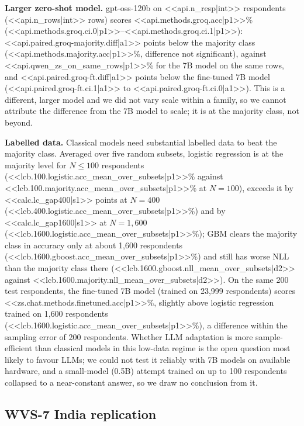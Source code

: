 \documentclass[conference]{IEEEtran}
\begin{document}
\textbf{Larger zero-shot model.} gpt-oss-120b on <<api.n_resp|int>> respondents (<<api.n_rows|int>> rows) scores <<api.methods.groq.acc|p1>>\% (<<api.methods.groq.ci.0|p1>>--<<api.methods.groq.ci.1|p1>>): <<api.paired.groq-majority.diff|a1>> points below the majority class (<<api.methods.majority.acc|p1>>\%, difference not significant), against <<api.qwen_zs_on_same_rows|p1>>\% for the 7B model on the same rows, and <<api.paired.groq-ft.diff|a1>> points below the fine-tuned 7B model (<<api.paired.groq-ft.ci.1|a1>> to <<api.paired.groq-ft.ci.0|a1>>). This is a different, larger model and we did not vary scale within a family, so we cannot attribute the difference from the 7B model to scale; it is at the majority class, not beyond.

\textbf{Labelled data.} Classical models need substantial labelled data to beat the majority class. Averaged over five random subsets, logistic regression is at the majority level for $N\le100$ respondents (<<lcb.100.logistic.acc_mean_over_subsets|p1>>\% against <<lcb.100.majority.acc_mean_over_subsets|p1>>\% at $N=100$), exceeds it by <<calc.lc_gap400|s1>> points at $N=400$ (<<lcb.400.logistic.acc_mean_over_subsets|p1>>\%) and by <<calc.lc_gap1600|s1>> at $N=1{,}600$ (<<lcb.1600.logistic.acc_mean_over_subsets|p1>>\%); GBM clears the majority class in accuracy only at about 1{,}600 respondents (<<lcb.1600.gboost.acc_mean_over_subsets|p1>>\%) and still has worse NLL than the majority class there (<<lcb.1600.gboost.nll_mean_over_subsets|d2>> against <<lcb.1600.majority.nll_mean_over_subsets|d2>>). On the same 200 test respondents, the fine-tuned 7B model (trained on 23{,}999 respondents) scores <<zs.chat.methods.finetuned.acc|p1>>\%, slightly above logistic regression trained on 1{,}600 respondents (<<lcb.1600.logistic.acc_mean_over_subsets|p1>>\%), a difference within the sampling error of 200 respondents. Whether LLM adaptation is more sample-efficient than classical models in this low-data regime is the open question most likely to favour LLMs; we could not test it reliably with 7B models on available hardware, and a small-model (0.5B) attempt trained on up to 100 respondents collapsed to a near-constant answer, so we draw no conclusion from it.

\subsection{WVS-7 India replication}
\end{document}
